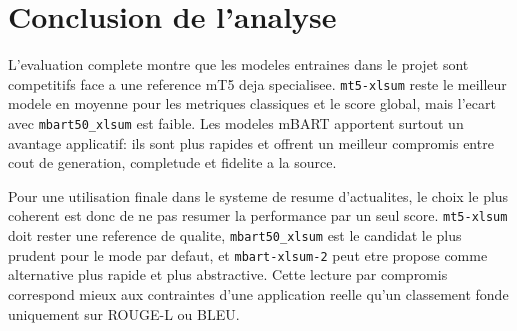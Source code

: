\section{Conclusion de l'analyse}

L'evaluation complete montre que les modeles entraines dans le projet sont competitifs face a une reference mT5 deja specialisee. \texttt{mt5-\allowbreak xlsum} reste le meilleur modele en moyenne pour les metriques classiques et le score global, mais l'ecart avec \texttt{mbart50\_\allowbreak xlsum} est faible. Les modeles mBART apportent surtout un avantage applicatif: ils sont plus rapides et offrent un meilleur compromis entre cout de generation, completude et fidelite a la source.

Pour une utilisation finale dans le systeme de resume d'actualites, le choix le plus coherent est donc de ne pas resumer la performance par un seul score. \texttt{mt5-\allowbreak xlsum} doit rester une reference de qualite, \texttt{mbart50\_\allowbreak xlsum} est le candidat le plus prudent pour le mode par defaut, et \texttt{mbart-\allowbreak xlsum-2} peut etre propose comme alternative plus rapide et plus abstractive. Cette lecture par compromis correspond mieux aux contraintes d'une application reelle qu'un classement fonde uniquement sur ROUGE-L ou BLEU.
